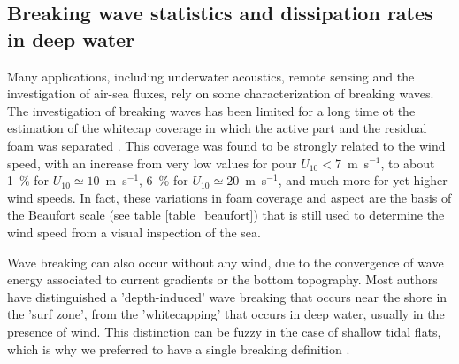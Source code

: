 \subsection{Breaking wave statistics and dissipation rates in deep water}
Many applications, including underwater acoustics, remote sensing and the investigation of 
air-sea fluxes, rely on some characterization of breaking waves. The investigation of breaking waves 
has been limited for a long time ot the estimation of the whitecap coverage in which the active part and the residual 
foam was separated  \citep[e.g.][]{Monahan&Woolf1989}. This coverage was found to be strongly related to the wind speed, 
with an increase from very low values for pour $U_{10} < 7$~m~s$^{-1}$, to about 1~\% for $U_{10} \simeq
10$~m~s$^{-1}$,  6~\% for $U_{10} \simeq 20$~m~s$^{-1}$, and much more for yet higher wind speeds. In fact, 
these variations in foam coverage and aspect are the basis of the Beaufort scale (see table \ref{table_beaufort}) that 
is still used to determine the wind speed from a visual inspection of the sea. 

Wave breaking can also occur without any wind, due to the convergence of wave energy associated to 
current gradients or the bottom topography.  Most authors have distinguished a 'depth-induced'
wave breaking that occurs near the shore in the 'surf zone', from the 'whitecapping' that occurs in deep water, usually 
in the presence of wind. This distinction can be fuzzy in the case of shallow tidal flats, which is why we preferred 
to have a single breaking definition \citep{Filipot&Ardhuin2012}. 

